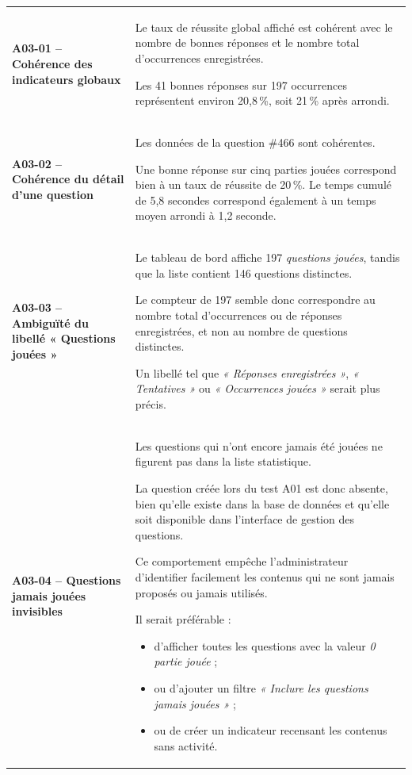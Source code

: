 \begin{longtable}{
    |>{\raggedright\arraybackslash}p{}
    |>{\raggedright\arraybackslash}p{}|
}
\rowcolor{orange!50}
\multicolumn{2}{|c|}{
    \textbf{Commentaires, observations et anomalies constatées}
}
\\
\hline

\textbf{A03-01 -- Cohérence des indicateurs globaux}
&
Le taux de réussite global affiché est cohérent avec le nombre de bonnes
réponses et le nombre total d'occurrences enregistrées.

Les 41 bonnes réponses sur 197 occurrences représentent environ 20,8\,\%,
soit 21\,\% après arrondi.
\\
\hline

\textbf{A03-02 -- Cohérence du détail d'une question}
&
Les données de la question \#466 sont cohérentes.

Une bonne réponse sur cinq parties jouées correspond bien à un taux de
réussite de 20\,\%. Le temps cumulé de 5,8 secondes correspond également à
un temps moyen arrondi à 1,2 seconde.
\\
\hline

\textbf{A03-03 -- Ambiguïté du libellé « Questions jouées »}
&
Le tableau de bord affiche 197 \textit{questions jouées}, tandis que la
liste contient 146 questions distinctes.

Le compteur de 197 semble donc correspondre au nombre total d'occurrences
ou de réponses enregistrées, et non au nombre de questions distinctes.

Un libellé tel que \textit{« Réponses enregistrées »},
\textit{« Tentatives »} ou \textit{« Occurrences jouées »} serait plus
précis.
\\
\hline

\textbf{A03-04 -- Questions jamais jouées invisibles}
&
Les questions qui n'ont encore jamais été jouées ne figurent pas dans la
liste statistique.

La question créée lors du test A01 est donc absente, bien qu'elle existe
dans la base de données et qu'elle soit disponible dans l'interface de
gestion des questions.

Ce comportement empêche l'administrateur d'identifier facilement les
contenus qui ne sont jamais proposés ou jamais utilisés.

Il serait préférable :
\begin{itemize}[leftmargin=*,nosep]
    \item d'afficher toutes les questions avec la valeur
    \textit{0 partie jouée} ;
    \item ou d'ajouter un filtre
    \textit{« Inclure les questions jamais jouées »} ;
    \item ou de créer un indicateur recensant les contenus sans activité.
\end{itemize}
\\
\hline


\end{longtable}
